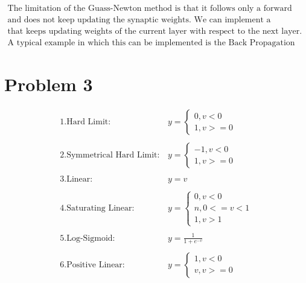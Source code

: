 \documentclass[12pt]{article}
\begin{document}
\begin{gather*}
  \text{The limitation of the Guass-Newton method is that it follows only a forward pass approach}\\
  \text{and does not keep updating the synaptic weights. We can implement a backward pass system}\\
  \text{that keeps updating weights of the current layer with respect to the next layer.}\\
  \text{A typical example in which this can be implemented is the Back Propagation Algorithm.}
\end{gather*}

\section*{Problem 3}
\begin{align*}
    1.\text{Hard Limit}: &y = \begin{cases}
                            0,  v<0 \\
                            1,  v>= 0
                        \end{cases}\\\\
    2.\text{Symmetrical Hard Limit}: &y = \begin{cases}
                            -1,  v<0 \\
                            1,  v>= 0
                        \end{cases}\\\\ 
    3.\text{Linear}: &y = v\\\\
    4.\text{Saturating Linear}: &y = \begin{cases}
                            0,  v<0 \\
                            n,  0<=v<1\\
                            1,  v>1
                        \end{cases}\\\\
    5.\text{Log-Sigmoid: }&y =\frac{1}{1+e^{-v}} \\\\
    6.\text{Positive Linear}: &y = \begin{cases}
                            1,  v<0 \\
                            v,  v>= 0
                        \end{cases}\\\\
\end{align*}
\end{document}

